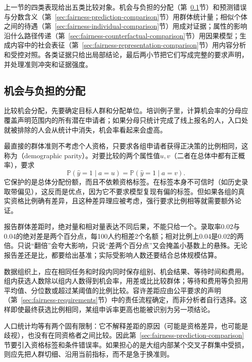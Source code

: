 上一节的四类表现给出五类比较对象。机会与负担的分配（第~\ref{sec:fairness-group-comparison}节）和预测错误与分数含义（第~\ref{sec:fairness-prediction-comparison}节）用群体统计量；相似个体之间的待遇（第~\ref{sec:fairness-individual-comparison}节）用成对证据；属性的影响沿什么路径传递（第~\ref{sec:fairness-counterfactual-comparison}节）用因果模型；生成内容中的社会表征（第~\ref{sec:fairness-representation-comparison}节）用内容分析和受控对照。各类证据只给出局部结论，最后两小节把它们写成完整的要求声明，并处理准则冲突和证据强度。

\subsection{机会与负担的分配}
\label{sec:fairness-group-comparison}

比较机会分配，先要确定目标人群和分配单位。培训例子里，计算机会率的分母应覆盖声明范围内的所有潜在申请者；如果分母只统计完成了线上报名的人，入口处就被排除的人会从统计中消失，机会率看起来会虚高。

最直接的群体准则不考虑个人资格，只要求各组申请者获得正决策的比例相同，这称为（demographic parity）。对要比较的两个属性值$u,v$（二者在总体中都有正概率），要求
\[
 \mathbb P(\hat y=1\mid a=u)
 =\mathbb P(\hat y=1\mid a=v).
\]
它保护的是总体分配份额，而且不依赖资格标签。在标签本身不可信时（如历史录取带偏见），这反而是优点，因为它不要求模型复现有偏的标签。但如果各组的真实资格比例确有差异，且这种差异理应被考虑，强行要求比例相等就需要额外论证。

报告群体差距时，绝对量和相对量表达不同后果，不能只给一个。录取率0.02与0.04的绝对差是两个百分点，每100人约相差2个名额；相对比例上0.04是0.02的两倍。只说“翻倍”会夸大影响，只说“差两个百分点”又会掩盖小基数上的悬殊。无论报告差还是比，都要给出基准；实际受影响人数还要结合总体规模估算。

数据组织上，应在相同任务和时段内同时保存组别、机会结果、等待时间和费用。组内获选人数除以组内人数得到机会率，用差或比比较群体；等待和费用等负担用平均值、分位数或超过某阈值的比例比较。容许差距应由公平要求的声明（第~\ref{sec:fairness-requirements}节）中的责任流程确定，而非分析者自行选择。这样即使最终获选比例相同，某组申诉率更高也能被识别为另一项结论。

人口统计均等有两个固有限制：它不解释差距的原因（可能是资格差异，也可能是歧视），也没有在同资格者之间比较。因此第~\ref{sec:fairness-prediction-comparison}节要引入资格标签和条件错误率。如果担心的是大组内部某个交叉子群集中受损，则应先把人群切细、沿用当前指标，而不是急于换准则。

